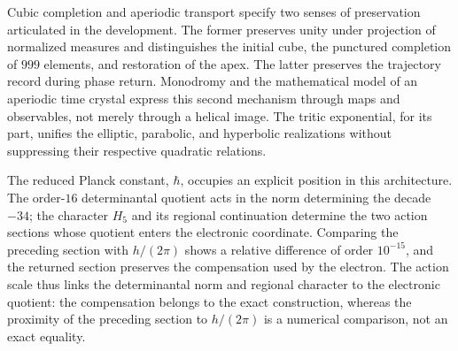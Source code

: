 Cubic completion and aperiodic transport specify two senses
of preservation articulated in the development. The former preserves
unity under projection of normalized measures and distinguishes the
initial cube, the punctured completion of \(999\) elements, and restoration
of the apex. The latter preserves the trajectory record during
phase return. Monodromy and the mathematical model of an aperiodic
time crystal express this second mechanism through maps and
observables, not merely through a helical image. The tritic
exponential, for its part, unifies the elliptic, parabolic, and
hyperbolic realizations without suppressing their respective quadratic relations.

The reduced Planck constant, \(\hbar\), occupies an explicit position
in this architecture. The order-\(16\) determinantal quotient acts
in the norm determining the decade \(-34\); the character \(H_5\) and its
regional continuation determine the two action sections whose
quotient enters the electronic coordinate. Comparing the
preceding section with \(h/(2\pi)\) shows a relative difference of
order \(10^{-15}\), and the returned section preserves the compensation
used by the electron. The action scale thus links the determinantal norm
and regional character to the electronic quotient: the compensation belongs
to the exact construction, whereas the proximity of the preceding section
to \(h/(2\pi)\) is a numerical comparison, not an exact equality.
